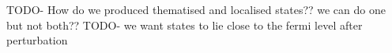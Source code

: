 TODO- How do we produced thematised and localised states??
we can do one but not both??
TODO- we want states to lie close to the fermi level after
perturbation

